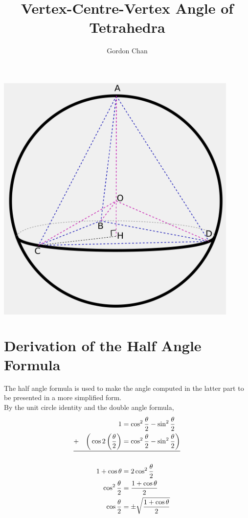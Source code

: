 \documentclass[a4paper]{article}
\title{Vertex-Centre-Vertex Angle of Tetrahedra}
\author{Gordon Chan}
\begin{document}
\maketitle
\begin{center}
\includegraphics[width=0.9\textwidth]{tetrahedron.png}
\end{center}
\newpage

\section{Derivation of the Half Angle Formula}
The half angle formula is used to make the angle computed in the latter part
to be presented in a more simplified form.\\
By the unit circle identity and the double angle formula,
\[\begin{aligned}
    1&=\cos^2\frac\theta2-\sin^2\frac\theta2\\
    +\quad\bigg(\cos2\left(\frac\theta2\right)&=\cos^2\frac\theta2-\sin^2\frac\theta2\bigg)\\
    \midrule\\
    1+\cos\theta&=2\cos^2\frac\theta2\\
    \cos^2\frac\theta2&=\frac{1+\cos\theta}2\\
    \cos\frac\theta2&=\pm\sqrt{\frac{1+\cos\theta}2}
\end{aligned}\]
\end{document}
